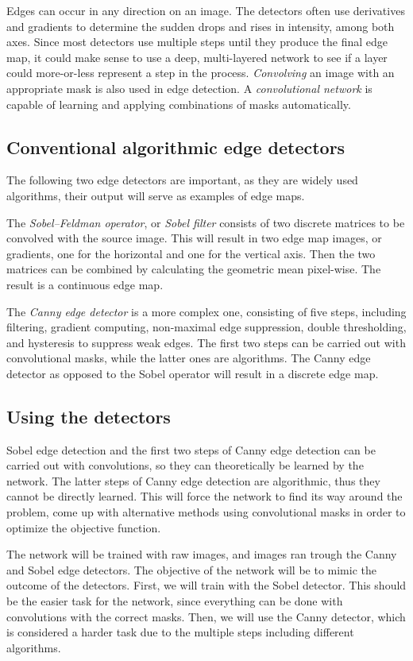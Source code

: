 \documentclass[12pt]{report}
\begin{document}
Edges can occur in any direction on an image. The detectors often use derivatives and gradients to determine the sudden drops and rises in intensity, among both axes. Since most detectors use multiple steps until they produce the final edge map, it could make sense to use a deep, multi-layered network to see if a layer could more-or-less represent a step in the process. \textit{Convolving} an image with an appropriate mask is also used in edge detection. A \textit{convolutional network} is capable of learning and applying combinations of masks automatically.
\subsection{Conventional algorithmic edge detectors}
The following two edge detectors are important, as they are widely used algorithms, their output will serve as examples of edge maps.

The \textit{Sobel–Feldman operator}, or \textit{Sobel filter} \cite{sobel} consists of two discrete matrices to be convolved with the source image. This will result in two edge map images, or gradients, one for the horizontal and one for the vertical axis. Then the two matrices can be combined by calculating the geometric mean pixel-wise. The result is a continuous edge map.

The \textit{Canny edge detector} \cite{canny} is a more complex one, consisting of five steps, including filtering, gradient computing, non-maximal edge suppression, double thresholding, and hysteresis to suppress weak edges. The first two steps can be carried out with convolutional masks, while the latter ones are algorithms. The Canny edge detector as opposed to the Sobel operator will result in a discrete edge map.
\subsection{Using the detectors}
Sobel edge detection and the first two steps of Canny edge detection can be carried out with convolutions, so they can theoretically be learned by the network. The latter steps of Canny edge detection are algorithmic, thus they cannot be directly learned.
This will force the network to find its way around the problem, come up with alternative methods using convolutional masks in order to optimize the objective function.

The network will be trained with raw images, and images ran trough the Canny and Sobel edge detectors. The objective of the network will be to mimic the outcome of the detectors. First, we will train with the Sobel detector. This should be the easier task for the network, since everything can be done with convolutions with the correct masks. Then, we will use the Canny detector, which is considered a harder task due to the multiple steps including different algorithms.
\end{document}
